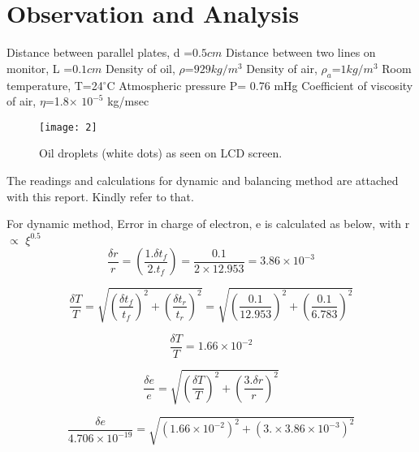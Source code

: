 \documentclass[a4paper, amsfonts, amssymb, amsmath, reprint, showkeys, nofootinbib, twoside]{revtex4-1}
\begin{document}
\section{Observation and Analysis}
Distance between parallel plates, d =$0.5 cm$\newline
Distance between two lines on monitor, L =$0.1 cm$\newline
Density of oil, $\rho$=$929kg/m^3$\newline
Density of air, $\rho_a$=$1kg/m^3$\newline
Room temperature, T=24$^\circ$C\newline
Atmospheric pressure P= 0.76 mHg\newline
Coefficient of viscosity of air, $\eta$=1.8$\times$ $10^{-5}$ kg/msec\newline

\begin{figure}[H] %
	\centering
	\texttt{[image: 2]} 
	\caption{Oil droplets (white dots) as seen on LCD screen. }
	\label{2}
\end{figure}

The readings and calculations for dynamic and balancing method are attached with this report. Kindly refer to that.

For dynamic method,
Error in charge of electron, e is calculated as below, with r$\propto$ $\xi^{0.5}$
\begin{equation}
	\frac{\delta r}{r}= \left(\frac{1.\delta t_f}{2.t_f}\right)=\frac{0.1}{2\times12.953}=3.86\times10^{-3}
\end{equation}

\begin{equation}
	\frac{\delta T}{T}=\sqrt{ \left(\frac{\delta t_f}{t_f}\right)^2+\left(\frac{\delta t_r}{t_r}\right)^2}=\sqrt{ \left(\frac{0.1}{12.953}\right)^2+\left(\frac{0.1}{6.783}\right)^2}
\end{equation}

\begin{equation}
	\frac{\delta T}{T}=1.66\times10^{-2}
\end{equation}

\begin{equation}
	\frac{\delta e}{e}=\sqrt{ \left(\frac{\delta T}{T}\right)^2+\left(\frac{3.\delta r}{r}\right)^2}
\end{equation}

\begin{equation}
	\frac{\delta e}{4.706\times10^{-19}}=\sqrt{ \left(1.66\times10^{-2}\right)^2+\left(3.\times3.86\times10^{-3}\right)^2}
\end{equation}
\end{document}
